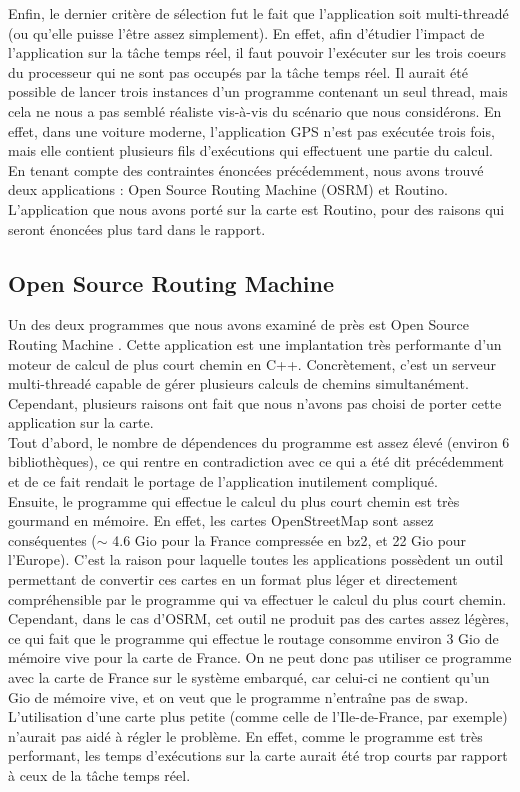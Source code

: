 Enfin, le dernier critère de sélection fut le fait que l'application soit 
multi-threadé (ou qu'elle puisse l'être assez simplement). En effet, afin 
d'étudier l'impact de l'application sur la tâche temps réel, il faut pouvoir 
l'exécuter sur les trois coeurs du processeur qui ne sont pas occupés par la
tâche temps réel. Il aurait été possible de lancer trois instances d'un 
programme contenant un seul thread, mais cela ne nous a pas semblé réaliste 
vis-à-vis du scénario que nous considérons. En effet, dans une voiture moderne, 
l'application GPS n'est pas exécutée trois fois, mais elle contient plusieurs 
fils d'exécutions qui effectuent une partie du calcul. \\

En tenant compte des contraintes énoncées précédemment, nous avons trouvé deux
applications : Open Source Routing Machine (OSRM) et Routino. L'application que
nous avons porté sur la carte est Routino, pour des raisons qui seront énoncées
plus tard dans le rapport.

\subsection{Open Source Routing Machine}

Un des deux programmes que nous avons examiné de près est Open Source Routing 
Machine \cite{_open_????}. Cette application est une implantation 
très performante d'un moteur de calcul de plus court chemin en C++. 
Concrètement, c'est un serveur multi-threadé capable de gérer plusieurs calculs 
de chemins simultanément. Cependant, plusieurs raisons ont fait que nous 
n'avons pas choisi de porter cette application sur la carte. \\

Tout d'abord, le nombre de dépendences du programme est assez élevé (environ 
6 bibliothèques), ce qui rentre en contradiction avec ce qui a été dit 
précédemment et de ce fait rendait le portage de l'application inutilement
compliqué. \\

Ensuite, le programme qui effectue le calcul du plus court chemin est très 
gourmand en mémoire. En effet, les cartes OpenStreetMap sont assez conséquentes 
($\sim$ 4.6 Gio pour la France compressée en bz2, et 22 Gio pour l'Europe). C'est
 la raison pour laquelle toutes les applications possèdent un outil permettant 
de convertir ces cartes en un format plus léger et directement compréhensible 
par le programme qui va effectuer le calcul du plus court chemin. Cependant, 
dans le cas d'OSRM, cet outil ne produit pas des cartes assez légères, ce qui 
fait que le programme qui effectue le routage consomme environ 3 Gio de mémoire 
vive pour la carte de France. On ne peut donc pas utiliser ce programme avec la 
carte de France sur le système embarqué, car celui-ci ne contient qu'un Gio de 
mémoire vive, et on veut que le programme n'entraîne pas de swap. L'utilisation 
d'une carte plus petite (comme celle de l'Ile-de-France, par exemple) n'aurait 
pas aidé à régler le problème. En effet, comme le programme est très performant,
les temps d'exécutions sur la carte aurait été trop courts par rapport à ceux 
de la tâche temps réel. \\

